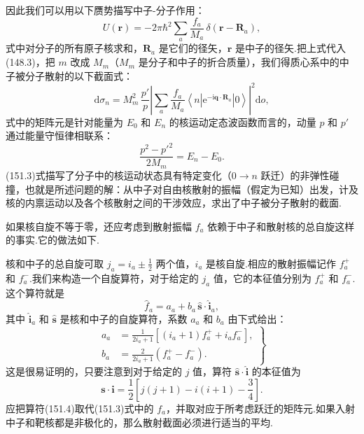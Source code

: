 因此我们可以用以下赝势描写中子-分子作用：
\begin{equation}
  U(\boldsymbol{r})=-2\pi\hbar^2\sum_a\frac{f_a}{M_a}\,\delta(\boldsymbol{r}-\boldsymbol{R}_a),
\end{equation}
式中对分子的所有原子核求和，$\boldsymbol{R}_a$ 是它们的径矢，$\boldsymbol{r}$ 是中子的径矢.把上式代入(148.3)，把 $m$ 改成 $M_m$（$M_m$ 是分子和中子的折合质量），我们得质心系中的中子被分子散射的以下截面式：
\begin{equation}
  \mathrm{d}\sigma_n=M_m^2\,\frac{p'}{p}
  \left|\sum_a\frac{f_a}{M_a}
  \left\langle n\left|\mathrm{e}^{-\mathrm{i}\boldsymbol{q}\cdot\boldsymbol{R}_a}\right|0\right\rangle\right|^2
  \mathrm{d}o,
\end{equation}
式中的矩阵元是针对能量为 $E_0$ 和 $E_n$ 的核运动定态波函数而言的，动量 $p$ 和 $p'$ 通过能量守恒律相联系：
\begin{equation*}
  \frac{p^2-p'^2}{2M_m}=E_n-E_0.
\end{equation*}
(151.3)式描写了分子中的核运动状态具有特定变化（$0\to n$ 跃迁）的非弹性碰撞，也就是所述问题的解：从中子对自由核散射的振幅（假定为已知）出发，计及核的内禀运动以及各个核散射之间的干涉效应，求出了中子被分子散射的截面.

如果核自旋不等于零，还应考虑到散射振幅 $f_a$ 依赖于中子和散射核的总自旋这样的事实.它的做法如下.

核和中子的总自旋可取 $j_a=i_a\pm\frac{1}{2}$ 两个值，$i_a$ 是核自旋.相应的散射振幅记作 $f_a^{+}$ 和 $f_a^{-}$.我们来构造一个自旋算符，对于给定的 $j_a$ 值，它的本征值分别为 $f_a^{+}$ 和 $f_a^{-}$.这个算符就是
\begin{equation}
  \hat{f}_a=a_a+b_a\,\hat{\boldsymbol{s}}\cdot\hat{\boldsymbol{i}}_a,
\end{equation}
其中 $\hat{\boldsymbol{i}}_a$ 和 $\hat{\boldsymbol{s}}$ 是核和中子的自旋算符，系数 $a_a$ 和 $b_a$ 由下式给出：
\begin{equation}
\left.\begin{aligned}
  a_a&=\frac{1}{2i_a+1}\left[(i_a+1)f_a^{+}+i_af_a^{-}\right],\\
  b_a&=\frac{2}{2i_a+1}\left(f_a^{+}-f_a^{-}\right).
\end{aligned}\right\}
\end{equation}
这是很易证明的，只要注意到对于给定的 $j$ 值，算符 $\hat{\boldsymbol{s}}\cdot\hat{\boldsymbol{i}}$ 的本征值为
\begin{equation*}
  \boldsymbol{s}\cdot\boldsymbol{i}
  =\frac{1}{2}\left[j(j+1)-i(i+1)-\frac{3}{4}\right].
\end{equation*}
应把算符(151.4)取代(151.3)式中的 $f_a$，并取对应于所考虑跃迁的矩阵元.如果入射中子和靶核都是非极化的，那么散射截面必须进行适当的平均.

